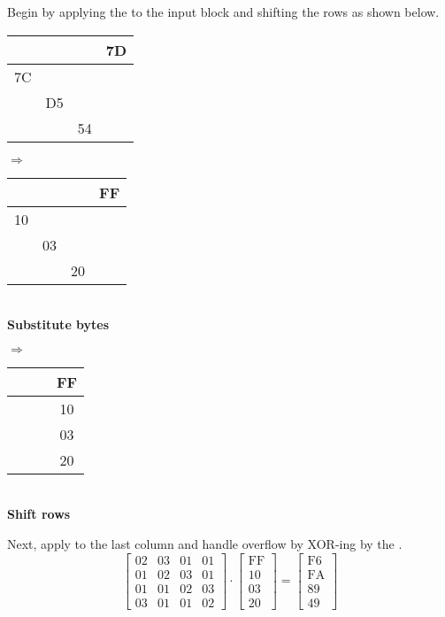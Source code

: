 \documentclass[../hw_sols.tex]{subfiles}
\begin{document}
\begin{solution}

Begin by applying the  to the input block and shifting the 
rows as shown below.

\begin{center}
\begin{minipage}[t]{0.3\textwidth}
\centering
\begin{tabular}{| c | c | c | c |}
	\hline
	   &    &    & 7D \\ \hline
	7C &    &    &    \\ \hline
	   & D5 &    &    \\ \hline
	   &    & 54 &    \\ \hline
\end{tabular}
\end{minipage}
{\Large $\Rightarrow$}
\begin{minipage}[t]{0.3\textwidth}
\centering
\begin{tabular}{| c | c | c | c |}
	\hline
	   &    &    & FF \\ \hline
	10 &    &    &    \\ \hline
	   & 03 &    &    \\ \hline
	   &    & 20 &    \\ \hline
\end{tabular} \\[4pt]
\textbf{Substitute bytes}
\end{minipage}
{\Large $\Rightarrow$}
\begin{minipage}[t]{0.3\textwidth}
\centering
\begin{tabular}{| *{3}{ p{10pt} |} c |}
	\hline
	& & & FF \\ \hline
	& & & 10 \\ \hline
	& & & 03 \\ \hline
	& & & 20 \\ \hline
\end{tabular} \\[4pt]
\textbf{Shift rows}
\end{minipage}
\end{center}

Next, apply  to the last column and handle overflow by 
XOR-ing by the .
	\[
	\begin{bmatrix}
		02 & 03 & 01 & 01 \\
		01 & 02 & 03 & 01 \\
		01 & 01 & 02 & 03 \\
		03 & 01 & 01 & 02 
	\end{bmatrix} 
	\cdot 
	\begin{bmatrix}
		\text{FF} \\ 10 \\ 03 \\ 20
	\end{bmatrix} 
	= 
	\begin{bmatrix}
		\text{F6} \\
		\text{FA} \\
		\text{89} \\
		\text{49}
	\end{bmatrix}
	\]


\end{solution}
\end{document}
